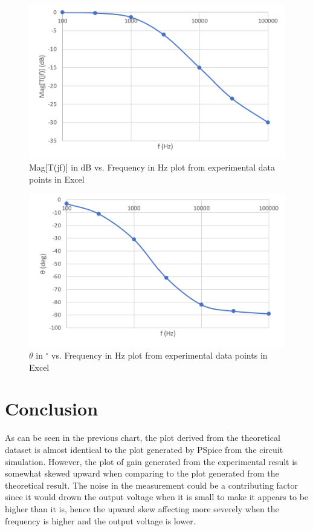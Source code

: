 \documentclass{article}
\begin{document}
\begin{figure}[H]
  \centering
  \includegraphics[width=\textwidth]{ECE2200_Lab1_excel_exp.png}
  \caption{Mag[T(jf)] in dB vs. Frequency in Hz plot from experimental data points in Excel}
\end{figure}
\begin{figure}[H]
  \centering
  \includegraphics[width=\textwidth]{ECE2200_Lab1_excel_theta.png}
  \caption{$\theta$ in $^\circ$ vs. Frequency in Hz plot from experimental data points in Excel}
\end{figure}

\pagebreak

\section*{Conclusion}
As can be seen in the previous chart, the plot derived from the theoretical dataset is almost identical to the plot generated by PSpice from the circuit simulation. However, the plot of gain generated from the experimental result is somewhat skewed upward when comparing to the plot generated from the theoretical result. The noise in the measurement could be a contributing factor since it would drown the output voltage when it is small to make it appears to be higher than it is, hence the upward skew affecting more severely when the frequency is higher and the output voltage is lower.
\end{document}
